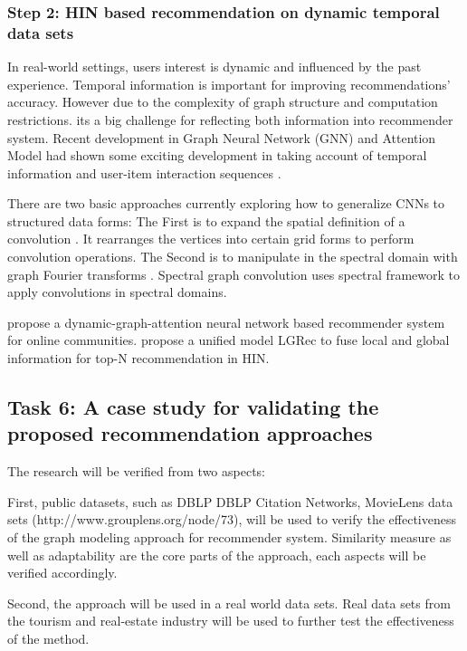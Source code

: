 \subsubsection*{Step 2: HIN based recommendation on dynamic temporal data sets}

In real-world settings, users interest is dynamic and influenced by the past experience. Temporal information is important for improving recommendations' accuracy. However due to the complexity of graph structure and computation restrictions. its a big challenge for reflecting both information into recommender system. Recent development in Graph Neural Network (GNN) and Attention Model had shown some exciting development in taking account of temporal information and user-item interaction sequences \citep{yu2017spatio}.  

There are two basic approaches currently exploring how to generalize CNNs to structured data forms: 
The First is to expand the spatial definition of a convolution \citep{niepert2016learning}. It rearranges the vertices into certain grid forms to perform convolution operations. The Second is to manipulate in the spectral domain with graph Fourier transforms \citep{bruna2013spectral}. Spectral graph convolution uses spectral framework to apply convolutions in spectral domains.

\citet{song2019session} propose a dynamic-graph-attention neural network based recommender system for online communities. \citet{Hu2018recommender} propose a unified model LGRec to fuse local and global information for top-N recommendation in HIN.


\subsection{Task 6:  A case study for validating the proposed recommendation approaches}

The research will be verified from two aspects: 

First, public datasets, such as DBLP DBLP Citation Networks, MovieLens data sets (http://www.grouplens.org/node/73), will be used to verify the effectiveness of the graph modeling approach for recommender system. Similarity measure as well as adaptability are the core parts of the approach, each aspects will be verified accordingly. 

Second, the approach will be used in a real world data sets. Real data sets from the tourism and real-estate industry will be used to further test the effectiveness of the method.

